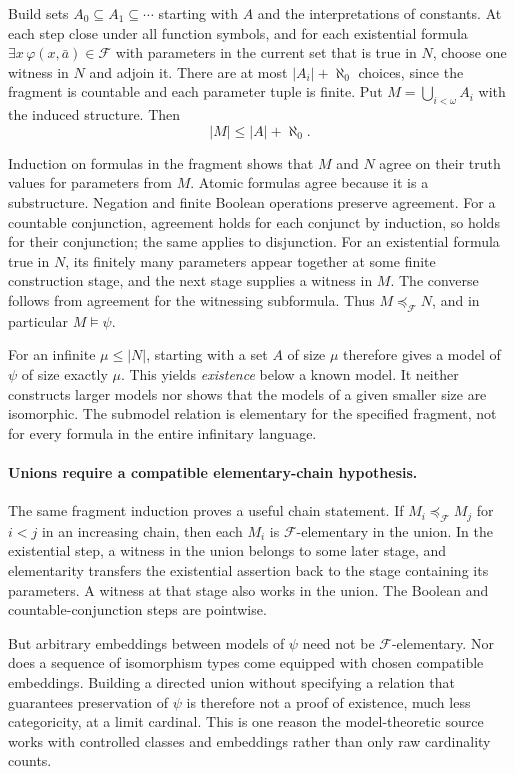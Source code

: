 \documentclass[11pt]{article}
\begin{document}
Build sets $A_0\subseteq A_1\subseteq\cdots$ starting with $A$
and the interpretations of constants. At each step close under all
function symbols, and for each existential formula
$\exists x\,\varphi(x,\bar a)\in\mathcal F$ with parameters in
the current set that is true in $N$, choose one witness in $N$ and
adjoin it. There are at most $|A_i|+\aleph_0$ choices, since the
fragment is countable and each parameter tuple is finite. Put
$M=\bigcup_{i<\omega}A_i$ with the induced structure. Then
\[
 |M|\le |A|+\aleph_0.
 \tag{370.3}
\]

Induction on formulas in the fragment shows that $M$ and $N$ agree
on their truth values for parameters from $M$. Atomic formulas agree
because it is a substructure. Negation and finite Boolean operations
preserve agreement. For a countable conjunction, agreement holds for
each conjunct by induction, so holds for their conjunction; the same
applies to disjunction. For an existential formula true in $N$, its
finitely many parameters appear together at some finite construction
stage, and the next stage supplies a witness in $M$. The converse
follows from agreement for the witnessing subformula. Thus
$M\preccurlyeq_{\mathcal F}N$, and in particular $M\models\psi$.

For an infinite $\mu\le|N|$, starting with a set $A$ of size $\mu$
therefore gives a model of $\psi$ of size exactly $\mu$. This yields
\emph{existence} below a known model. It neither constructs larger
models nor shows that the models of a given smaller size are isomorphic.
The submodel relation is elementary for the specified fragment, not
for every formula in the entire infinitary language.

\paragraph{Unions require a compatible elementary-chain hypothesis.}
The same fragment induction proves a useful chain statement. If
$M_i\preccurlyeq_{\mathcal F}M_j$ for $i<j$ in an increasing chain,
then each $M_i$ is $\mathcal F$-elementary in the union. In the
existential step, a witness in the union belongs to some later stage,
and elementarity transfers the existential assertion back to the stage
containing its parameters. A witness at that stage also works in the
union. The Boolean and countable-conjunction steps are pointwise.

But arbitrary embeddings between models of $\psi$ need not be
$\mathcal F$-elementary. Nor does a sequence of isomorphism types
come equipped with chosen compatible embeddings. Building a directed
union without specifying a relation that guarantees preservation of
$\psi$ is therefore not a proof of existence, much less categoricity,
at a limit cardinal. This is one reason the model-theoretic source
works with controlled classes and embeddings rather than only raw
cardinality counts.
\end{document}
